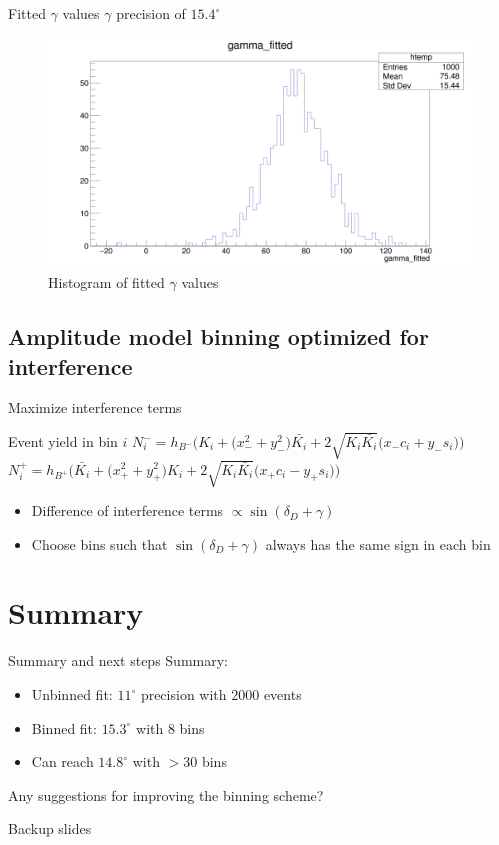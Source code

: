 \documentclass{beamer}
\begin{document}
\begin{frame}{Fitted $\gamma$ values}
  $\gamma$ precision of $15.4^\circ$
  \begin{figure}
    \centering
    \includegraphics[width = 1.0\textwidth]{AmplitudePulls/gammafitted1K1K.png}
    \caption{Histogram of fitted $\gamma$ values}
  \end{figure}
\end{frame}

\subsection{Amplitude model binning optimized for interference}
\begin{frame}{Maximize interference terms}
  \begin{block}{Event yield in bin $i$}
    $N^-_i = h_{B^-}\Big(K_i + \big(x_-^2 + y_-^2\big)\bar{K_i} + 2\sqrt{K_i\bar{K_i}}\big(x_-c_i + y_-s_i\big)\Big)$
    $N^+_i = h_{B^+}\Big(\bar{K_i} + \big(x_+^2 + y_+^2\big)K_i + 2\sqrt{K_i\bar{K_i}}\big(x_+c_i - y_+s_i\big)\Big)$
  \end{block}
  \begin{itemize}
    \item{Difference of interference terms $\propto\sin(\delta_D + \gamma)$}
    \item{Choose bins such that $\sin(\delta_D + \gamma)$ always has the same sign in each bin}
  \end{itemize}
\end{frame}

\section{Summary}
\begin{frame}{Summary and next steps}
  Summary:
  \begin{itemize}
    \item{Unbinned fit: $11^\circ$ precision with $2000$ events}
    \item{Binned fit: $15.3^\circ$ with $8$ bins}
    \item{Can reach $14.8^\circ$ with $>30$ bins}
  \end{itemize}
  Any suggestions for improving the binning scheme?
\end{frame}

\begin{frame}
  Backup slides
\end{frame}
\end{document}
